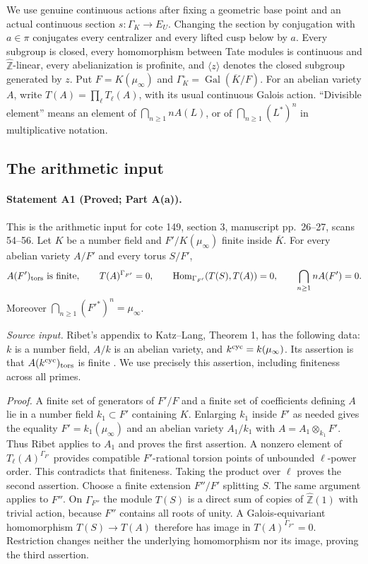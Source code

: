 
We use genuine continuous actions after fixing a geometric base point and an actual continuous section $s:\Gamma_K\to E_U$. Changing the section by conjugation with $a\in\pi$ conjugates every centralizer and every lifted cusp below by $a$. Every subgroup is closed, every homomorphism between Tate modules is continuous and $\widehat{\mathbb Z}$-linear, every abelianization is profinite, and $\langle z\rangle$ denotes the closed subgroup generated by $z$. Put $F=K(\mu_\infty)$ and $\Gamma_K^\circ=\operatorname{Gal}(\overline K/F)$. For an abelian variety $A$, write $T(A)=\prod_\ell T_\ell(A)$, with its usual continuous Galois action. ``Divisible element'' means an element of $\bigcap_{n\geq1}nA(L)$, or of $\bigcap_{n\geq1}(L^*)^n$ in multiplicative notation.

\subsection{The arithmetic input}
\paragraph{Statement A1 (Proved; Part A(a)).}\label{res:A1}
This is the arithmetic input for cote 149, section 3, manuscript pp.~26--27, scans 54--56.
Let $K$ be a number field and $F'/K(\mu_\infty)$ finite inside $\overline K$. For every abelian variety $A/F'$ and every torus $S/F'$,
\[
 A(F')_{\rm tors}\text{ is finite},\qquad T(A)^{\Gamma_{F'}}=0,
 \qquad\operatorname{Hom}_{\Gamma_{F'}}(T(S),T(A))=0,
 \qquad\bigcap_{n\geq1}nA(F')=0.
\]
Moreover $\bigcap_{n\geq1}(F'^*)^n=\mu_\infty$.

\emph{Source input.} Ribet's appendix to Katz--Lang, Theorem 1, has the following data: $k$ is a number field, $A/k$ is an abelian variety, and $k^{\rm cyc}=k(\mu_\infty)$. Its assertion is that $A(k^{\rm cyc})_{\rm tors}$ is finite \cite[Appendix, Theorem 1, p.~315]{Ribet1981}. We use precisely this assertion, including finiteness across all primes.

\emph{Proof.} A finite set of generators of $F'/F$ and a finite set of coefficients defining $A$ lie in a number field $k_1\subset F'$ containing $K$. Enlarging $k_1$ inside $F'$ as needed gives the equality $F'=k_1(\mu_\infty)$ and an abelian variety $A_1/k_1$ with $A=A_1\otimes_{k_1}F'$. Thus Ribet applies to $A_1$ and proves the first assertion. A nonzero element of $T_\ell(A)^{\Gamma_{F'}}$ provides compatible $F'$-rational torsion points of unbounded $\ell$-power order. This contradicts that finiteness. Taking the product over $\ell$ proves the second assertion. Choose a finite extension $F''/F'$ splitting $S$. The same argument applies to $F''$. On $\Gamma_{F''}$ the module $T(S)$ is a direct sum of copies of $\widehat{\mathbb Z}(1)$ with trivial action, because $F''$ contains all roots of unity. A Galois-equivariant homomorphism $T(S)\to T(A)$ therefore has image in $T(A)^{\Gamma_{F''}}=0$. Restriction changes neither the underlying homomorphism nor its image, proving the third assertion.

